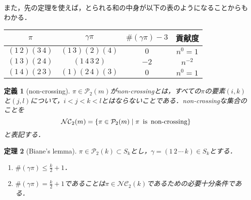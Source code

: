 \documentclass{ltjsarticle}
\makeatletter
\theoremstyle{mystyle1}
\newtheorem{dfn}{定義}[section]
\newtheorem{thm}[dfn]{定理}
\theoremstyle{mystyle2}
\theoremstyle{mystyle3}
\renewenvironment{proof}[1][\proofname]{\par
  \pushQED{\qed}%
  \normalfont
  \topsep6\p@\@plus6\p@ \trivlist
  \item[\hskip\labelsep{\bfseries\sffamily #1}]\ignorespaces
}{%
  \popQED\endtrivlist\@endpefalse
}
\renewcommand\proofname{証明}
\makeatother
\begin{document}
\begin{proof}
    また，先の定理を使えば，とられる和の中身が以下の表のようになることからもわかる．
    \begin{table}[hbtp]
        \centering
        \begin{tabular}{cccc}
            \hline
            $\pi$          & $\gamma\pi$    & $\#(\gamma\pi)-3$ & 貢献度   \\
            \hline \hline
            $(1\,2)(3\,4)$ & $(1\,3)(2)(4)$ & $0$               & $n^0=1$  \\
            $(1\,3)(2\,4)$ & $(1\,4\,3\,2)$ & $-2$              & $n^{-2}$ \\
            $(1\,4)(2\,3)$ & $(1)(2\,4)(3)$ & $0$               & $n^0=1$  \\
            \hline
        \end{tabular}
    \end{table}
\end{proof}

\begin{dfn}[non-crossing]
    $\pi\in\mathcal{P}_2(m)$がnon-crossingとは，すべての$\pi$の要素$(i,k)$と$(j,l)$について，$i<j<k<l$とはならないことである．non-crossingな集合のことを
    \begin{equation}
        \mathcal{NC}_2(m)=\{\pi\in\mathcal{P}_2(m)\mid\pi\,\textrm{ is\, non-crossing}\}
    \end{equation}
    と表記する．
\end{dfn}

\begin{thm}[Biane's lemma]
    $\pi\in\mathcal{P}_2(k)\subset S_k$とし，$\gamma=(1\,2\,\cdots\,k)\in S_k$とする．
    \begin{enumerate}
        \item $\#(\gamma\pi)\leq\frac{k}{2}+1$．
        \item $\#(\gamma\pi)=\frac{k}{2}+1$であることは$\pi\in\mathcal{NC}_2(k)$であるための必要十分条件である．
    \end{enumerate}
    \begin{comment}
    別の書き方をすれば
    \begin{enumerate}
        \item $|\gamma|\leq |\pi|+|\gamma\pi|$．
        \item $|\gamma|=|\pi|+|\gamma\pi|$であることは，$\pi\in\mathcal{NC}_2(k)$であるための必要十分条件である．
    \end{enumerate}
    \end{comment}
\end{thm}
\end{document}
